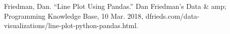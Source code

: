 \documentclass[fontsize=11pt]{article}
\begin{document}
    Friedman, Dan. “Line Plot Using Pandas.” Dan Friedman's Data \& amp; Programming Knowledge Base, 10 Mar. 2018, dfrieds.com/data-visualizations/line-plot-python-pandas.html. \\


\end{document}
